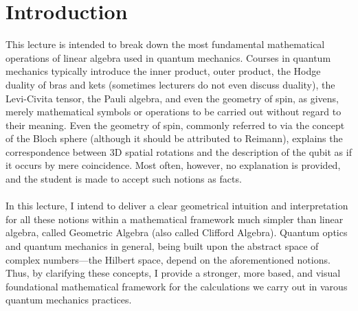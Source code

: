 \section{Introduction}

This lecture is intended to break down the most fundamental mathematical operations of linear algebra used in quantum mechanics. Courses in quantum mechanics typically introduce the inner product, outer product, the Hodge duality of bras and kets (sometimes lecturers do not even discuss duality), the Levi-Civita tensor, the Pauli algebra, and even the geometry of spin, as givens, merely mathematical symbols or operations to be carried out without regard to their meaning. Even the geometry of spin, commonly referred to via the concept of the Bloch sphere (although it should be attributed to Reimann), explains the correspondence between 3D spatial rotations and the description of the qubit as if it occurs by mere coincidence. Most often, however, no explanation is provided, and the student is made to accept such notions as facts.
\\ \\
In this lecture, I intend to deliver a clear geometrical intuition and interpretation for all these notions within a mathematical framework much simpler than linear algebra, called Geometric Algebra (also called Clifford Algebra). Quantum optics and quantum mechanics in general, being built upon the abstract space of complex numbers—the Hilbert space, depend on the aforementioned notions. Thus, by clarifying these concepts, I provide a stronger, more based, and visual foundational mathematical framework for the calculations we carry out in varous quantum mechanics practices. 
